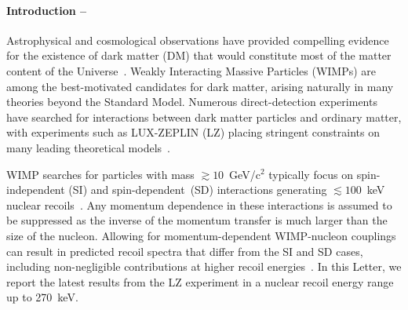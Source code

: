 \paragraph{\label{sec:introduction}Introduction --}

Astrophysical and cosmological observations have provided compelling evidence for the existence of dark matter (DM) that would constitute most of the matter content of the Universe~\cite{1937ApJ,1970ApJ...159..379R,Clowe_2006,Planck2018VI}.
Weakly Interacting Massive Particles (WIMPs) are among the best-motivated candidates for dark matter, arising naturally in many theories beyond the Standard Model.
Numerous direct-detection experiments have searched for interactions between dark matter particles and ordinary matter, with experiments such as LUX-ZEPLIN (LZ) placing stringent constraints on many leading theoretical models~\cite{LZ:SR3_WS2024, XenonnT:WIMP-SI-2025,PandaX4T:WIMP-2025,DEAP3600:2026_WIMP,DarkSide-50:2018_532days,SuperCDMS:2018_WIMP,EDELWEISS:2019_WIMP,CRESST:2019_DM,PICO:2019_DM}.

WIMP searches for particles with mass  $\gtrsim10$~GeV/c$^2$ typically focus on spin-independent (SI) and spin-dependent~(SD) interactions generating $\lesssim100$~keV nuclear recoils~\cite{Lewin:1995rx, Goodman:1984dc, Griest:1988ma}.
Any momentum dependence in these interactions is assumed to be suppressed as the inverse of the momentum transfer is much larger than the size of the nucleon. 
Allowing for momentum-dependent WIMP-nucleon couplings can result in predicted recoil spectra that differ from the SI and SD cases, including non-negligible contributions at higher recoil energies~\cite{Chang:2009yt,Feldstein:2009tr}. 
In this Letter, we report the latest results from the LZ experiment in a nuclear recoil energy range up to 270~keV.


